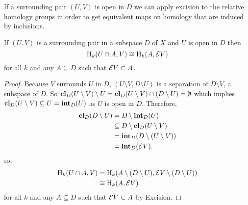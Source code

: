 If a surrounding pair $(U, V)$ is open in $D$ we can apply excision to the relative homology groups in order to get equivalent maps on homology that are induced by inclusions.

\begin{lemma}\label{lem:excision}
  If $(U, V)$ is a surrounding pair in a subspace $D$ of $X$ and $U$ is open in $D$ then
  \[ \mathrm{H}_k(U\cap A, V) \cong \mathrm{H}_k(A, \mathcal{E} V) \]
  for all $k$ and any $A\subseteq D$ such that $\mathcal{E} V\subset A$.
\end{lemma}
\begin{proof}
  Because $V$ surrounds $U$ in $D$, $(U\setminus V, D\setminus U)$ is a separation of $D\setminus V$, a subspace of $D$.
  So $\mathbf{cl}_D(U\setminus V)\setminus U = \mathbf{cl}_D(U\setminus V) \cap (D\setminus U) = \emptyset$ which implies $\mathbf{cl}_D(U\setminus V)\subseteq U = \mathbf{int}_D(U)$ as $U$ is open in $D$.
  Therefore,
  \begin{align*}
    \mathbf{cl}_D(D\setminus U) &= D\setminus \mathbf{int}_D(U)\\
                        &\subseteq D\setminus \mathbf{cl}_D(U\setminus V)\\
                        &= \mathbf{int}_D(D\setminus (U\setminus V))\\
                        &= \mathbf{int}_D(\mathcal{E} V).
  \end{align*}
  so,
  \begin{align*}
    \mathrm{H}_k(U\cap A, V) &= \mathrm{H}_k(A\setminus (D\setminus U), \mathcal{E} V\setminus (D\setminus U))\\
      &\cong \mathrm{H}_k(A, \mathcal{E} V)
  \end{align*}
  for all $k$ and any $A\subseteq D$ such that $\mathcal{E} V\subset A$ by Excision.
\end{proof}
